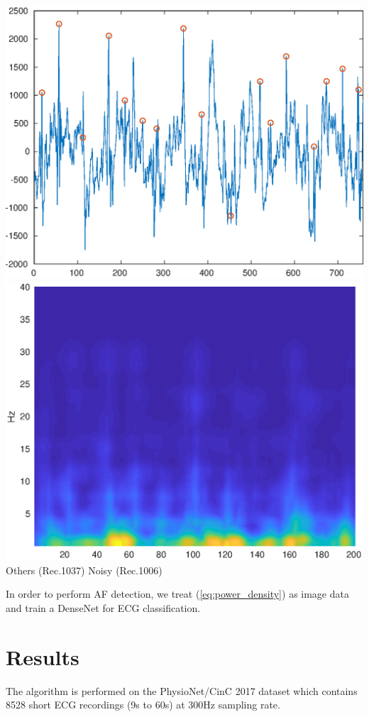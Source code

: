 \documentclass[portrait,a0,final]{a0poster} %
\begin{document}
\begin{minipage}{0.98\linewidth}
\begin{minipage}[t]{0.47\linewidth}
\begin{minipage}[t]{\linewidth}
	\includegraphics[width=0.245\linewidth]{figures/1006}
	\includegraphics[width=0.245\linewidth]{figures/ave-noise-1006}
	\\Others (Rec.1037) \hspace{11cm} Noisy (Rec.1006)
\end{minipage}

\setlength{\parindent}{10mm}
\vspace{10mm}
In order to perform AF detection, we treat (\ref{eq:power_density}) as image data and train a DenseNet for ECG classification.

\section*{Results}
The algorithm is performed on the PhysioNet/CinC 2017 dataset which contains 8528 short ECG recordings (9s to 60s) at 300Hz sampling rate. 


\end{minipage}
\end{minipage}
\end{document}
